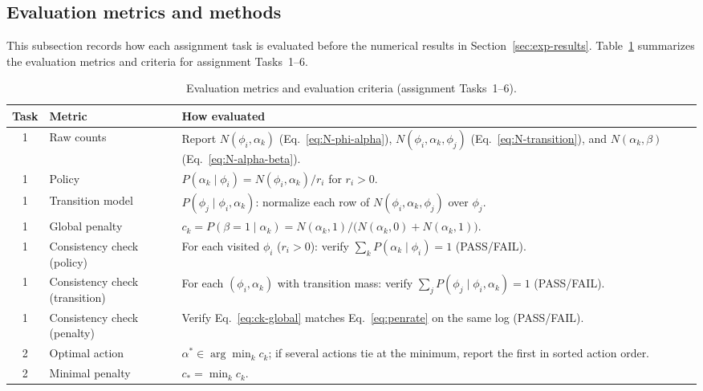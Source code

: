 \documentclass[11pt,a4paper]{article}
\begin{document}
\subsection{Evaluation metrics and methods}\label{sec:eval-metrics}

This subsection records how each assignment task is evaluated before the numerical
results in Section~\ref{sec:exp-results}.
Table~\ref{tab:eval-metrics} summarizes the evaluation metrics and criteria for
assignment Tasks~1--6.

\begin{table}[H]
  \centering
  \caption{Evaluation metrics and evaluation criteria (assignment Tasks~1--6).}
  \label{tab:eval-metrics}
  \small
  \begin{tabularx}{\linewidth}{@{}c
      >{\raggedright\arraybackslash}p{2.55cm}
      >{\raggedright\arraybackslash}X@{}}
    \hline
    Task & Metric & How evaluated \\
    \hline
    1 & Raw counts &
    Report $N(\phi_i,\alpha_k)$ (Eq.~\eqref{eq:N-phi-alpha}),
    $N(\phi_i,\alpha_k,\phi_j)$ (Eq.~\eqref{eq:N-transition}), and
    $N(\alpha_k,\beta)$ (Eq.~\eqref{eq:N-alpha-beta}). \\
    \hline
    1 & Policy &
    $P(\alpha_k\mid\phi_i)=N(\phi_i,\alpha_k)/r_i$ for $r_i>0$. \\
    \hline
    1 & Transition model &
    $P(\phi_j\mid\phi_i,\alpha_k)$: normalize each row of $N(\phi_i,\alpha_k,\phi_j)$
    over $\phi_j$. \\
    \hline
    1 & Global penalty &
    $c_k=P(\beta{=}1\mid\alpha_k)=N(\alpha_k,1)/\bigl(N(\alpha_k,0)+N(\alpha_k,1)\bigr)$. \\
    \hline
    1 & Consistency check (policy) &
    For each visited $\phi_i$ ($r_i>0$): verify $\sum_k P(\alpha_k\mid\phi_i)=1$
    (PASS/FAIL). \\
    \hline
    1 & Consistency check (transition) &
    For each $(\phi_i,\alpha_k)$ with transition mass: verify
    $\sum_j P(\phi_j\mid\phi_i,\alpha_k)=1$ (PASS/FAIL). \\
    \hline
    1 & Consistency check (penalty) &
    Verify Eq.~\eqref{eq:ck-global} matches Eq.~\eqref{eq:penrate} on the same log
    (PASS/FAIL). \\
    \hline
    2 & Optimal action &
    $\alpha^\ast\in\arg\min_k c_k$; if several actions tie at the minimum, report the
    first in sorted action order. \\
    \hline
    2 & Minimal penalty &
    $c_\ast=\min_k c_k$. \\

\end{tabularx}
\end{table}
\end{document}
